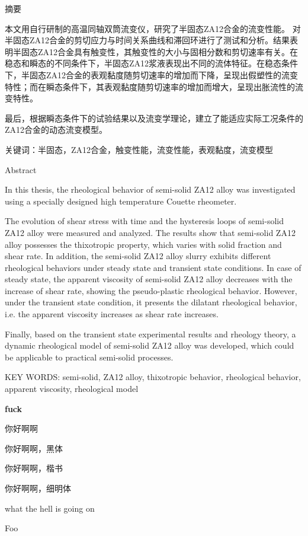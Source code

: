 \documentclass[a4paper, 12pt]{article}
\begin{document}
\vspace*{12pt}
\begin{center}
\LARGE 摘\quad 要
\end{center}

{
\par 本文用自行研制的高温同轴双筒流变仪，研究了半固态ZA12合金的流变性能。
对半固态ZA12合金的剪切应力与时间关系曲线和滞回环进行了测试和分析。结果表明半固态ZA12合金具有触变性，其触变性的大小与固相分数和剪切速率有关。在稳态和瞬态的不同条件下，半固态ZA12浆液表现出不同的流体特征。在稳态条件下，半固态ZA12合金的表观黏度随剪切速率的增加而下降，呈现出假塑性的流变特性；而在瞬态条件下，其表观黏度随剪切速率的增加而增大，呈现出胀流性的流变特性。
\par 最后，根据瞬态条件下的试验结果以及流变学理论，建立了能适应实际工况条件的ZA12合金的动态流变模型。\newline

\noindent 关键词：半固态，ZA12合金，触变性能，流变性能，表观黏度，流变模型
}
\newpage
\vspace*{12pt}
\begin{center}
Abstract
\end{center}
\par In this thesis, the rheological behavior of semi-solid ZA12 alloy was investigated using a specially designed high temperature Couette rheometer.
\par The evolution of shear stress with time and the hysteresis loops of semi-solid ZA12 alloy were measured and analyzed. The results show that semi-solid ZA12 alloy possesses the thixotropic property, which varies with solid fraction and shear rate. In addition, the semi-solid ZA12 alloy slurry exhibits different rheological behaviors under steady state and transient state conditions. In case of steady state, the apparent viscosity of semi-solid ZA12 alloy decreases with the increase of shear rate, showing the pseudo-plastic rheological behavior. However, under the transient state condition, it presents the dilatant rheological behavior, i.e. the apparent viscosity increases as shear rate increases.
\par Finally, based on the transient state experimental results and rheology theory, a dynamic rheological model of semi-solid ZA12 alloy was developed, which could be applicable to practical semi-solid processes.\newline

\noindent KEY WORDS: semi-solid, ZA12 alloy, thixotropic behavior, rheological behavior, apparent viscosity, rheological model
\newpage

\vspace*{36pt}
\tableofcontents

\newpage
\vspace{5cm}

\textbf{fuck}

\bigskip
你好啊啊

{\heiti 你好啊啊，黑体}

{\kaishu 你好啊啊，楷书}

{\mlu 你好啊啊，细明体}

what the hell is going on 

{\fontsize{50}{60}\selectfont Foo}
\end{document}
